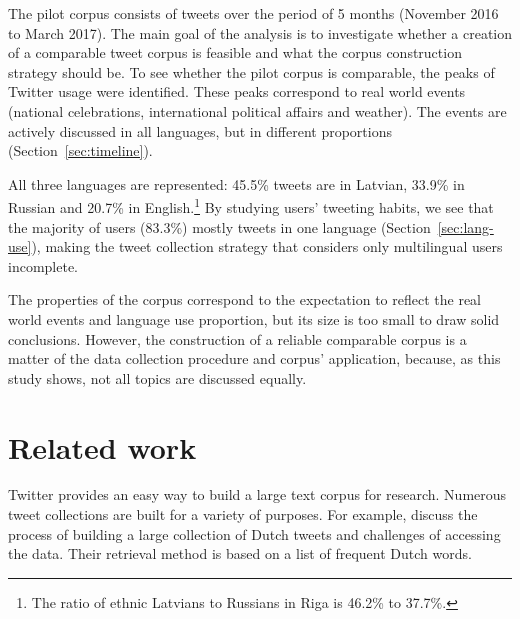\documentclass[11pt,a4paper]{article}
\begin{document}
The pilot corpus\footnotemark{} consists of tweets over the period of 5 months (November 2016 to March 2017). The main goal of the analysis is to investigate whether a creation of a comparable tweet corpus is feasible and what the corpus construction strategy should be. To see whether the pilot corpus is comparable, the peaks of Twitter usage were identified. These peaks correspond to real world events (national celebrations, international political affairs and weather). The events are actively discussed in all languages, but in different proportions (Section~\ref{sec:timeline}).


All three languages are represented: 45.5\% tweets are in Latvian, 33.9\% in Russian and 20.7\% in English.\footnote{
The ratio of ethnic Latvians to Russians in Riga is 46.2\% to 37.7\%.}
By studying users' tweeting habits, we see that the majority of users (83.3\%) mostly tweets in one language (Section~\ref{sec:lang-use}), making the tweet collection strategy that considers only multilingual users incomplete.

The properties of the corpus correspond to the expectation to reflect the real world events and language use proportion, but its size is too small to draw solid conclusions. However, the construction of a reliable comparable corpus is a matter of the data collection procedure and corpus' application, because, as this study shows, not all topics are discussed equally.


\section{Related work}

Twitter %
provides an easy way to build a large text corpus for research. Numerous tweet collections are built for a variety of purposes. For example, \citet{sang2013} discuss the process of building a large collection of Dutch tweets and challenges of accessing the data. %
Their retrieval method is based on a list of frequent Dutch words.
\end{document}
